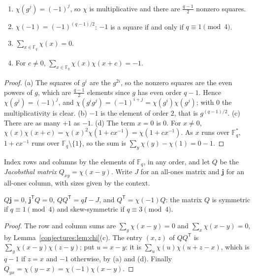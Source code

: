\begin{lemma}\label{conjectures:lem:chi}
\begin{enumerate}
\item $\chi(g^j)=(-1)^j$, so $\chi$ is multiplicative and there are $\frac{q-1}2$ nonzero squares.
\item $\chi(-1)=(-1)^{(q-1)/2}$: $-1$ is a square if and only if $q\equiv1\pmod4$.
\item $\sum_{x\in\mathbb F_q}\chi(x)=0$.
\item For $c\neq0$, $\sum_{x\in\mathbb F_q}\chi(x)\chi(x+c)=-1$.
\end{enumerate}
\end{lemma}
\begin{proof}
(a) The squares of $g^i$ are the $g^{2i}$, so the nonzero squares are the even powers of $g$, which are $\frac{q-1}2$ elements since $g$ has even order
$q-1$. Hence $\chi(g^j)=(-1)^j$, and $\chi(g^ig^j)=(-1)^{i+j}=\chi(g^i)\chi(g^j)$; with $0$ the multiplicativity is clear. (b) $-1$ is the element of
order $2$, that is $g^{(q-1)/2}$. (c) There are as many $+1$ as $-1$. (d) The term $x=0$ is $0$. For $x\neq0$,
$\chi(x)\chi(x+c)=\chi(x)^2\chi(1+cx^{-1})=\chi(1+cx^{-1})$. As $x$ runs over $\mathbb F_q^*$, $1+cx^{-1}$ runs over $\mathbb F_q\setminus\{1\}$, so the sum is
$\sum_y\chi(y)-\chi(1)=0-1$.
\end{proof}

Index rows and columns by the elements of $\mathbb F_q$, in any order, and let $Q$ be the \emph{Jacobsthal matrix} $Q_{xy}=\chi(x-y)$. Write $J$ for an
all-ones matrix and $\mathbf j$ for an all-ones column, with sizes given by the context.

\begin{lemma}\label{conjectures:lem:jacobsthal}
$Q\mathbf j=0$, $\mathbf j^{\mathsf T}Q=0$, $QQ^{\mathsf T}=qI-J$, and $Q^{\mathsf T}=\chi(-1)Q$: the matrix $Q$ is symmetric if $q\equiv1\pmod4$ and
skew-symmetric if $q\equiv3\pmod4$.
\end{lemma}
\begin{proof}
The row and column sums are $\sum_y\chi(x-y)=0$ and $\sum_x\chi(x-y)=0$, by Lemma~\ref{conjectures:lem:chi}(c). The entry $(x,z)$ of $QQ^{\mathsf T}$ is
$\sum_y\chi(x-y)\chi(z-y)$; put $u=x-y$: it is $\sum_u\chi(u)\chi(u+z-x)$, which is $q-1$ if $z=x$ and $-1$ otherwise, by (a) and (d). Finally
$Q_{yx}=\chi(y-x)=\chi(-1)\chi(x-y)$.
\end{proof}

